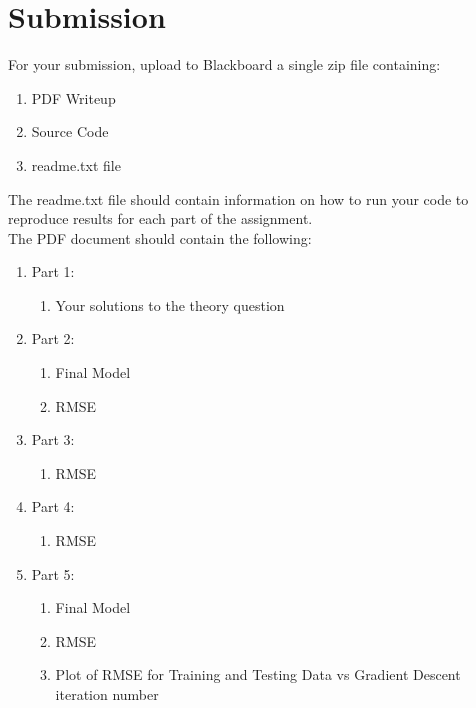 \documentclass[12pt]{article}
\begin{document}
\newpage
\section*{Submission}
For your submission, upload to Blackboard a single zip file containing:

\begin{enumerate}
\item PDF Writeup
\item Source Code
\item readme.txt file
\end{enumerate}

\noindent
The readme.txt file should contain information on how to run your code to reproduce results for each part of the assignment.\\

\noindent
The PDF document should contain the following:

\begin{enumerate}
\item Part 1:
	\begin{enumerate}
	\item Your solutions to the theory question
	\end{enumerate}
\item Part 2:
	\begin{enumerate}
	\item Final Model
	\item RMSE
	\end{enumerate}
\item Part 3:
	\begin{enumerate}
	\item RMSE
	\end{enumerate}
\item Part 4:
	\begin{enumerate}
	\item RMSE
	\end{enumerate}	
\item Part 5:
	\begin{enumerate}
	\item Final Model
	\item RMSE
	\item Plot of RMSE for Training and Testing Data vs Gradient Descent iteration number
	\end{enumerate}
\end{enumerate}
\end{document}
